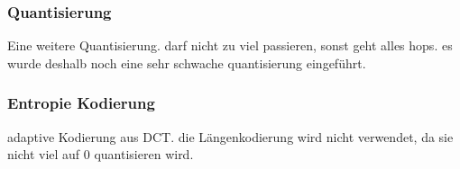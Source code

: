 \subsubsection{Quantisierung}
Eine weitere Quantisierung. darf nicht zu viel passieren, sonst geht alles hops. es wurde deshalb noch eine sehr schwache quantisierung eingeführt.

\subsubsection{Entropie Kodierung}
adaptive Kodierung aus DCT. die Längenkodierung wird nicht verwendet, da sie nicht viel auf 0 quantisieren wird. 